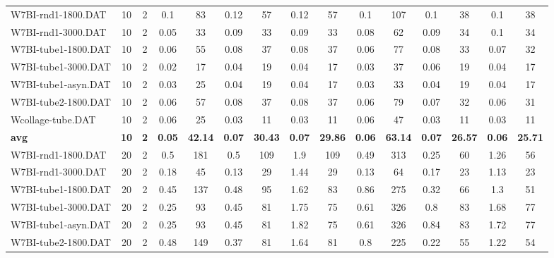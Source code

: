 \begin{table}[!ht]
{\begin{tabular}{lcccccccccccccc}
W7BI-rnd1-1800.DAT & 10 & 2 &  \textcolor{blue2}{0.1} & 83 & 0.12 & 57 & 0.12 & 57 &  \textcolor{blue2}{0.1} & 107 &  \textcolor{blue2}{0.1} & 38 &  \textcolor{blue2}{0.1} & 38 \\
W7BI-rnd1-3000.DAT & 10 & 2 &  \textcolor{blue2}{0.05} & 33 & 0.09 & 33 & 0.09 & 33 & 0.08 & 62 & 0.09 & 34 & 0.1 & 34 \\
W7BI-tube1-1800.DAT & 10 & 2 &  \textcolor{blue2}{0.06} & 55 & 0.08 & 37 & 0.08 & 37 &  \textcolor{blue2}{0.06} & 77 & 0.08 & 33 & 0.07 & 32 \\
W7BI-tube1-3000.DAT & 10 & 2 &  \textcolor{blue2}{0.02} & 17 & 0.04 & 19 & 0.04 & 17 & 0.03 & 37 & 0.06 & 19 & 0.04 & 17 \\
W7BI-tube1-asyn.DAT & 10 & 2 &  \textcolor{blue2}{0.03} & 25 & 0.04 & 19 & 0.04 & 17 &  \textcolor{blue2}{0.03} & 33 & 0.04 & 19 & 0.04 & 17 \\
W7BI-tube2-1800.DAT & 10 & 2 &  \textcolor{blue2}{0.06} & 57 & 0.08 & 37 & 0.08 & 37 &  \textcolor{blue2}{0.06} & 79 & 0.07 & 32 &  \textcolor{blue2}{0.06} & 31 \\
Wcollage-tube.DAT & 10 & 2 & 0.06 & 25 &  \textcolor{blue2}{0.03} & 11 &  \textcolor{blue2}{0.03} & 11 & 0.06 & 47 &  \textcolor{blue2}{0.03} & 11 &  \textcolor{blue2}{0.03} & 11 \\
\cline{1-15} \textbf{avg} & \textbf{10} & \textbf{2} & \textbf{0.05} & \textbf{42.14} & \textbf{0.07} & \textbf{30.43} & \textbf{0.07} & \textbf{29.86} & \textbf{0.06} & \textbf{63.14} & \textbf{0.07} & \textbf{26.57} & \textbf{0.06} & \textbf{25.71} \\ \cline{1-15}
W7BI-rnd1-1800.DAT & 20 & 2 & 0.5 & 181 & 0.5 & 109 & 1.9 & 109 & 0.49 & 313 &  \textcolor{blue2}{0.25} & 60 & 1.26 & 56 \\
W7BI-rnd1-3000.DAT & 20 & 2 & 0.18 & 45 &  \textcolor{blue2}{0.13} & 29 & 1.44 & 29 &  \textcolor{blue2}{0.13} & 64 & 0.17 & 23 & 1.13 & 23 \\
W7BI-tube1-1800.DAT & 20 & 2 & 0.45 & 137 & 0.48 & 95 & 1.62 & 83 & 0.86 & 275 &  \textcolor{blue2}{0.32} & 66 & 1.3 & 51 \\
W7BI-tube1-3000.DAT & 20 & 2 &  \textcolor{blue2}{0.25} & 93 & 0.45 & 81 & 1.75 & 75 & 0.61 & 326 & 0.8 & 83 & 1.68 & 77 \\
W7BI-tube1-asyn.DAT & 20 & 2 &  \textcolor{blue2}{0.25} & 93 & 0.45 & 81 & 1.82 & 75 & 0.61 & 326 & 0.84 & 83 & 1.72 & 77 \\
W7BI-tube2-1800.DAT & 20 & 2 & 0.48 & 149 & 0.37 & 81 & 1.64 & 81 & 0.8 & 225 &  \textcolor{blue2}{0.22} & 55 & 1.22 & 54 \\

\end{tabular}}
\end{table}
